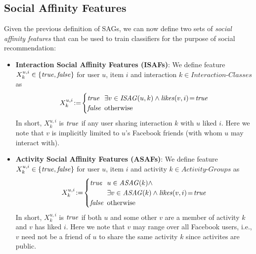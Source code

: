 \subsection{Social Affinity Features}

\label{ssec:SAfeature}

Given the previous definition of SAGs, we can now define two
sets of \emph{social affinity features} that can be used to train
classifiers for the purpose of social recommendation:

\begin{itemize} 
\item \textbf{Interaction Social Affinity Features (ISAFs)}: 
We define feature $X^{u,i}_k \in \{ \true, \false \}$ for user $u$, item $i$ and interaction
$k \in \textit{Interaction-Classes}$ as
  \begin{equation*}
   X^{u,i}_{k} \! := \!
      \begin{cases}
   		\true  \!\!\! & \exists v \in \mathit{ISAG}(u,k) \wedge \likes(v,i)\!=\!\true\\ 
   		\false \!\!\! & \text{otherwise}
      \end{cases}
  \end{equation*}
   In short, $X^{u,i}_{k}$ is $\true$ if any user sharing interaction $k$ with $u$ liked $i$.
   Here we note that $v$ is implicitly limited to $u$'s Facebook friends (with whom $u$
   may interact with).
\item \textbf{Activity Social Affinity Features (ASAFs)}: 
We define feature $X^{u,i}_k \in \{ \true, \false \}$ for user $u$, item $i$ and activity
$k \in \textit{Activity-Groups}$ as
  \begin{equation*}
   X^{u,i}_{k} \! := \! 
      \begin{cases}
   		\true  \!\!\! & u \in \mathit{ASAG}(k) \wedge \\
                              & \exists v \in \mathit{ASAG}(k) \wedge \likes(v,i)\!=\!\true\\
   		\false \!\!\! & \text{otherwise}
      \end{cases}
  \end{equation*}
  In short, $X^{u,i}_{k}$ is $\true$ if both $u$ and some other $v$ are a member of activity $k$
  and $v$ has liked $i$.  Here we note that $v$ may range over all Facebook users, 
  i.e., $v$ need not be a friend of $u$ to share the same activity $k$
  since activites are public.
\end{itemize}

